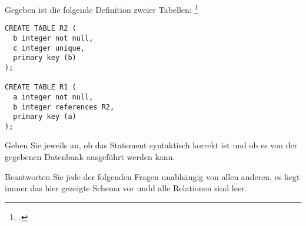 \documentclass{bschlangaul-aufgabe}
\begin{document}

Gegeben ist die folgende Definition zweier Tabellen:
\footcite{examen:66116:2017:09}

\begin{verbatim}
CREATE TABLE R2 (
  b integer not null,
  c integer unique,
  primary key (b)
);

CREATE TABLE R1 (
  a integer not null,
  b integer references R2,
  primary key (a)
);
\end{verbatim}

Geben Sie jeweils an, ob das Statement syntaktisch korrekt ist und ob es
von der gegebenen Datenbank ausgeführt werden kann.

Beantworten Sie jede der folgenden Fragen unabhängig von allen anderen,
\dh es liegt immer das hier gezeigte Schema vor undd alle Relationen
sind leer.
\end{document}
